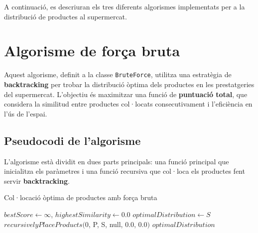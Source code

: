 \documentclass[a4paper,12pt]{report}
\begin{document}
\begin{itemize}
A continuació, es descriuran els tres diferents algorismes implementats per a la distribució de productes al supermercat.

\section{Algorisme de força bruta}

Aquest algorisme, definit a la classe \texttt{BruteForce}, utilitza una estratègia de \textbf{backtracking} per trobar la distribució òptima dels productes en les prestatgeries del supermercat. L'objectiu és maximitzar una funció de \textbf{puntuació total}, que considera la similitud entre productes col·locats consecutivament i l'eficiència en l'ús de l'espai.

\subsection{Pseudocodi de l'algorisme}
L'algorisme està dividit en dues parts principals: una funció principal que inicialitza els paràmetres i una funció recursiva que col·loca els productes fent servir \textbf{backtracking}.
\newline
\begin{algorithm}[H]
	\SetAlgoVlined
		\caption{Col·locació òptima de productes amb força bruta}
		$bestScore \gets \infty$, $highestSimilarity \gets 0.0$\;
		$optimalDistribution \gets S$\;
		$recursivelyPlaceProducts($0, P, S, null, 0.0, 0.0$)$\;
	\Return $optimalDistribution$\;

	\

\end{algorithm}





\end{itemize}
\end{document}
